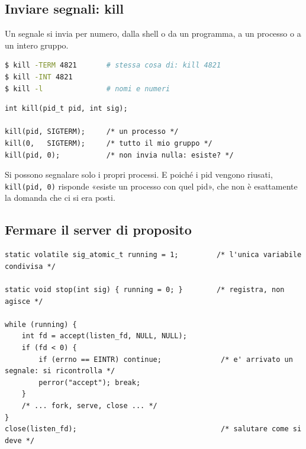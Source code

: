 
\subsection{Inviare segnali: kill}

Un segnale si invia per numero, dalla shell o da un programma, a un processo o a un intero gruppo.

\begin{lstlisting}[language=bash]
$ kill -TERM 4821       # stessa cosa di: kill 4821
$ kill -INT 4821
$ kill -l               # nomi e numeri
\end{lstlisting}

\begin{lstlisting}[language={[POSIX]C}]
int kill(pid_t pid, int sig);

kill(pid, SIGTERM);     /* un processo */
kill(0,   SIGTERM);     /* tutto il mio gruppo */
kill(pid, 0);           /* non invia nulla: esiste? */
\end{lstlisting}

Si possono segnalare solo i propri processi. E poiché i pid vengono riusati, \texttt{kill(pid, 0)} risponde «esiste un
processo con quel pid», che non è esattamente la domanda che ci si era posti.

\subsection{Fermare il server di proposito}

\begin{lstlisting}[language={[POSIX]C}, style=wnumbers, title={Un arresto ordinato}]
static volatile sig_atomic_t running = 1;         /* l'unica variabile condivisa */

static void stop(int sig) { running = 0; }        /* registra, non agisce */

while (running) {
    int fd = accept(listen_fd, NULL, NULL);
    if (fd < 0) {
        if (errno == EINTR) continue;              /* e' arrivato un segnale: si ricontrolla */
        perror("accept"); break;
    }
    /* ... fork, serve, close ... */
}
close(listen_fd);                                  /* salutare come si deve */
\end{lstlisting}

